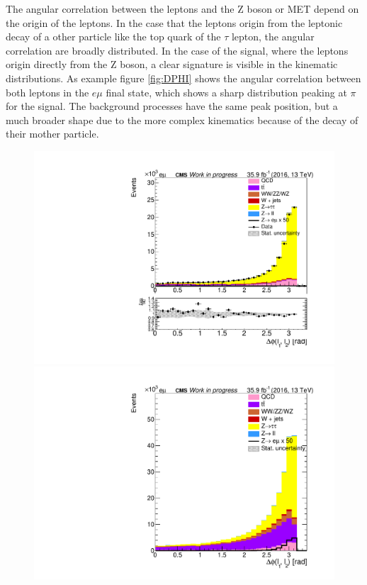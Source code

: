 The angular correlation between the leptons and the Z boson or \gls{MET} depend on the origin of the leptons. In the case that the leptons origin from the leptonic decay of a other particle like the top quark of the $\tau$ lepton, the angular correlation are broadly distributed. In the case of the signal, where the leptons origin directly from the Z boson, a clear signature is visible in the kinematic distributions. As example figure \ref{fig:DPHI} shows the angular correlation between both leptons in the $e\mu$ final state, which shows a sharp distribution peaking at $\pi$ for the signal. The background processes have the same peak position, but a much broader shape due to the more complex kinematics because of the decay of their mother particle. \\

\begin{figure}[htp]
	\centering

	\begin{multicols}{2}
		\includegraphics[width=\linewidth]{plots/em/DeltaPhiL1L2_CR.pdf}\par
		\includegraphics[width=\linewidth]{plots/em/DeltaPhiL1L2_withsignal.pdf}\par
	\end{multicols}


\end{figure}
